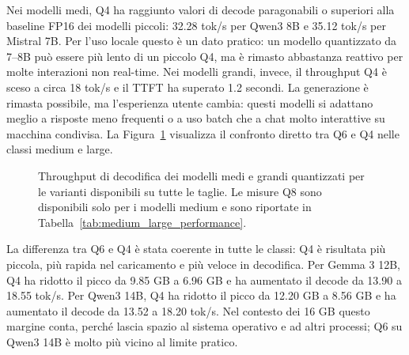 Nei modelli medi, Q4 ha raggiunto valori di decode paragonabili o superiori alla
baseline FP16 dei modelli piccoli: 32.28 tok/s per Qwen3 8B e 35.12 tok/s per
Mistral 7B. Per l'uso locale questo è un dato pratico: un modello quantizzato
da 7--8B può essere più lento di un piccolo Q4, ma è rimasto abbastanza reattivo
per molte interazioni non real-time. Nei modelli grandi, invece, il throughput
Q4 è sceso a circa 18 tok/s e il TTFT ha superato 1.2 secondi. La generazione è rimasta
possibile, ma l'esperienza utente cambia: questi modelli si adattano meglio a
risposte meno frequenti o a uso batch che a chat molto interattive su macchina
condivisa.
La Figura~\ref{fig:medium_large_decode} visualizza il confronto diretto tra Q6
e Q4 nelle classi medium e large.

\begin{figure}[ht]
  \centering
  \caption{Throughput di decodifica dei modelli medi e grandi quantizzati per
    le varianti disponibili su tutte le taglie. Le misure Q8 sono disponibili
    solo per i modelli medium e sono riportate in Tabella~\ref{tab:medium_large_performance}.}
  \label{fig:medium_large_decode}
\end{figure}

La differenza tra Q6 e Q4 è stata coerente in tutte le classi: Q4 è risultata
più piccola, più rapida nel caricamento e più veloce in decodifica. Per Gemma 3
12B, Q4 ha ridotto il picco da 9.85 GB a 6.96 GB e ha aumentato il decode da
13.90 a 18.55 tok/s. Per Qwen3 14B, Q4 ha ridotto il picco da 12.20 GB a 8.56
GB e ha aumentato il decode da 13.52 a 18.20 tok/s. Nel contesto dei 16 GB questo margine conta,
perché lascia spazio al sistema operativo e ad altri processi; Q6 su Qwen3 14B
è molto più vicino al limite pratico.

